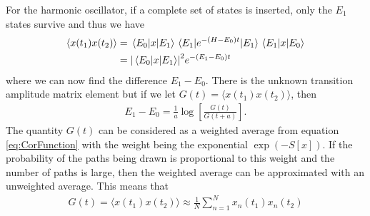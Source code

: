 \documentclass[11pt]{article}
\begin{document}
For the harmonic oscillator, if a complete set of states is inserted, only the $E_1$ states survive and thus we have
\begin{align}
	\langle x(t_1)x(t_2)\rangle&=\mel{E_0}{x}{E_1}\mel{E_1}{e^{-(H-E_0)t}}{E_1}\mel{E_1}{x}{E_0}\\
	&=\abs{\mel{E_0}{x}{E_1}}^2e^{-(E_1-E_0)t}
\end{align}
where we can now find the difference $E_1-E_0$. There is the unknown transition amplitude matrix element but if we let $G(t)=\langle x(t_1)x(t_2)\rangle$, then
\begin{align}
	E_1-E_0=\frac{1}{a}\log\left[\frac{G(t)}{G(t+a)}\right].
	\label{eq:ExciteE}
\end{align}
The quantity $G(t)$ can be considered as a weighted average from equation \ref{eq:CorFunction} with the weight being the exponential $\exp(-S[x])$. If the probability of the paths being drawn is proportional to this weight and the number of paths is large, then the weighted average can be approximated with an unweighted average. This means that
\begin{align}
	G(t)=\langle x(t_1)x(t_2)\rangle\approx\frac{1}{N}\sum_{n=1}^Nx_n(t_1)x_n(t_2)
	\label{eq:GApprox}
\end{align}
\end{document}
